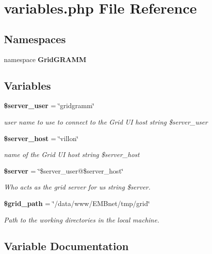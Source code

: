 \section{variables.php File Reference}
\label{variables_8php}
\subsection*{Namespaces}
\begin{CompactItemize}
\item 
namespace {\bf Grid\-GRAMM}
\end{CompactItemize}
\subsection*{Variables}
\begin{CompactItemize}
\item 
{\bf \$server\_\-user} = \char`\"{}gridgramm\char`\"{}
\begin{CompactList}\small\item\em user name to use to connect to the Grid UI host  string \$server\_\-user \item\end{CompactList}\item 
{\bf \$server\_\-host} = \char`\"{}villon\char`\"{}
\begin{CompactList}\small\item\em name of the Grid UI host  string \$server\_\-host \item\end{CompactList}\item 
{\bf \$server} = \char`\"{}\$server\_\-user@\$server\_\-host\char`\"{}
\begin{CompactList}\small\item\em Who acts as the grid server for us  string \$server. \item\end{CompactList}\item 
{\bf \$grid\_\-path} = \char`\"{}/data/www/EMBnet/tmp/grid\char`\"{}
\begin{CompactList}\small\item\em Path to the working directories in the local machine. \item\end{CompactList}\end{CompactItemize}


\subsection{Variable Documentation}
